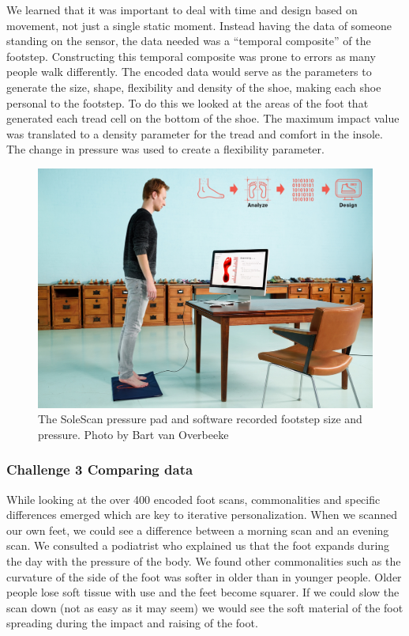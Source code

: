 We learned that it was important to deal with time and design based on movement, not just a single static moment. Instead having the data of someone standing on the sensor, the data needed was a ``temporal composite'' \cite{Koegel1992} of the footstep. Constructing this temporal composite was prone to errors as many people walk differently. The encoded data would serve as the parameters to generate the size, shape, flexibility and density of the shoe, making each shoe personal to the footstep. To do this we looked at the areas of the foot that generated each tread cell on the bottom of the shoe. The maximum impact value was translated to a density parameter for the tread and comfort in the insole. The change in pressure was used to create a flexibility parameter. 

\begin{figure}
\includegraphics[width=.5\textwidth]{SoleScan}
\caption{The SoleScan pressure pad and software recorded footstep size and pressure. Photo by Bart van Overbeeke}
\label{fig:Project1}
\end{figure}

\subsubsection{Challenge 3 Comparing data}

While looking at the over 400 encoded foot scans, commonalities and specific differences emerged which are key to iterative personalization. When we scanned our own feet, we could see a difference between a morning scan and an evening scan. We consulted a podiatrist who explained us that the foot expands during the day with the pressure of the body. We found other commonalities such as the curvature of the side of the foot was softer in older than in younger people. Older people lose soft tissue with use and the feet become squarer. If we could slow the scan down (not as easy as it may seem) we would see the soft material of the foot spreading during the impact and raising of the foot.

